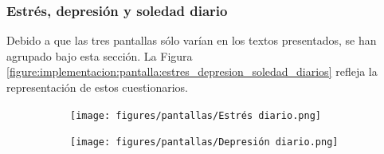                 \clearpage  %
            \subsubsection*{Estrés, depresión y soledad diario}
                Debido a que las tres pantallas sólo varían en los textos presentados, se han agrupado bajo esta sección. La Figura \ref{figure:implementacion:pantalla:estres_depresion_soledad_diarios} refleja la representación de estos cuestionarios.

                \begin{figure}[htbp]
                	\centering
                	\begin{subfigure}[c]{0.29\textwidth}
                		\centering
                		\texttt{[image: figures/pantallas/Estrés diario.png]}
                	\end{subfigure}
                	\hspace{0.05\textwidth}
                	\begin{subfigure}[c]{0.29\textwidth}
                		\centering
                		\texttt{[image: figures/pantallas/Depresión diario.png]}
                	\end{subfigure}
                    \hspace{0.05\textwidth}
                	\begin{subfigure}[c]{0.29\textwidth}
                		\centering

\end{subfigure}
\end{figure}
